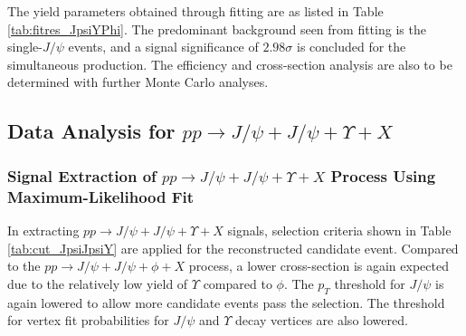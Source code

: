 \documentclass[10pt,twocolumn]{article}
\begin{document}
The yield parameters obtained through fitting are as listed in Table \ref{tab:fitres_JpsiYPhi}. The predominant background seen from fitting is the single-$J/\psi$ events, and a signal significance of $2.98 \sigma$ is concluded for the simultaneous production. The efficiency and cross-section analysis are also to be determined with further Monte Carlo analyses.

\subsection{Data Analysis for \texorpdfstring{$pp\to J/\psi+J/\psi+\Upsilon+X$}{pp -> J/psi + J/psi + Upsilon}}

\subsubsection{Signal Extraction of \texorpdfstring{$pp\to J/\psi+J/\psi+\Upsilon+X$}{pp -> J/psi + J/psi + Upsilon} Process Using Maximum-Likelihood Fit}

In extracting $pp\to J/\psi+J/\psi+\Upsilon+X$ signals, selection criteria shown in Table \ref{tab:cut_JpsiJpsiY} are applied for the reconstructed candidate event. Compared to the $pp\to J/\psi+J/\psi+\phi+X$ process, a lower cross-section is again expected due to the relatively low yield of $\Upsilon$ compared to $\phi$. The $p_T$ threshold for $J/\psi$ is again lowered to allow more candidate events pass the selection. The threshold for vertex fit probabilities for $J/\psi$ and $\Upsilon$ decay vertices are also lowered.
\end{document}
